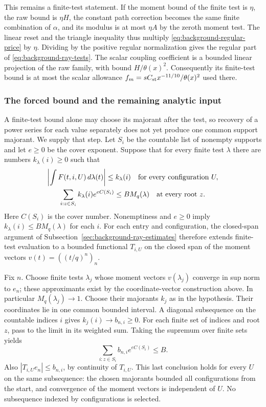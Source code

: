 This remains a finite-test statement. If the moment bound of
the finite test is $\eta$, the raw bound is $\eta H$, the
constant path correction becomes the same finite combination
of $\alpha$, and its modulus is at most $\eta A$ by the zeroth
moment test. The linear reset and the triangle inequality thus
multiply \eqref{eq:background-regular-price} by $\eta$.
Dividing by the positive regular normalization gives the regular
part of \eqref{eq:background-ray-tests}.
The scalar coupling coefficient is a bounded linear projection
of the raw family, with bound $H/\theta(x)^2$. Consequently its
finite-test bound is at most the scalar allowance
$f_m=sC_{\rm st}x^{-11/10}/\theta(x)^2$ used there.

\subsubsection{The forced bound and the remaining analytic input}
A finite-test bound alone may choose its majorant after the test,
so recovery of a power series for each value separately does not yet
produce one common support majorant. We supply that step. Let $S_i$
be the countable list of nonempty supports and let $e\ge0$ be the
cover exponent. Suppose that for every finite test $\lambda$ there
are numbers $k_\lambda(i)\ge0$ such that
\[
 \begin{gathered}
 \left|\int F(t,i,U)\,d\lambda(t)\right|\le k_\lambda(i)
 \quad\hbox{for every configuration }U,\\
 \sum_{i:z\in S_i}k_\lambda(i)e^{e C(S_i)}
                         \le B M_q(\lambda)
 \quad\hbox{at every root }z.
 \end{gathered}
\]
Here $C(S_i)$ is the cover number. Nonemptiness and $e\ge0$
imply $k_\lambda(i)\le B M_q(\lambda)$ for each $i$.
For each entry and configuration, the closed-span argument of
Subsection~\ref{sec:background-ray-estimates} therefore extends
finite-test evaluation to a bounded functional $T_{i,U}$ on the
closed span of the moment vectors $v(t)=((t/q)^n)_n$.

Fix $n$. Choose finite tests $\lambda_j$ whose moment vectors
$v(\lambda_j)$ converge in sup norm to $e_n$; these approximants
exist by the coordinate-vector construction above. In particular
$M_q(\lambda_j)\to1$. Choose their majorants $k_j$ as in the
hypothesis. Their coordinates lie in one common bounded interval.
A diagonal subsequence on the countable indices $i$ gives
$k_j(i)\to b_{n,i}\ge0$. For each finite set of indices and
root $z$, pass to the limit in its weighted sum. Taking the
supremum over finite sets yields
\[
                 \sum_{i:z\in S_i}b_{n,i}e^{e C(S_i)}\le B.
\]
Also $|T_{i,U}e_n|\le b_{n,i}$, by continuity of $T_{i,U}$.
This last conclusion holds for every $U$ on the same subsequence:
the chosen majorants bounded all configurations from the start,
and convergence of the moment vectors is independent of $U$.
No subsequence indexed by configurations is selected.

